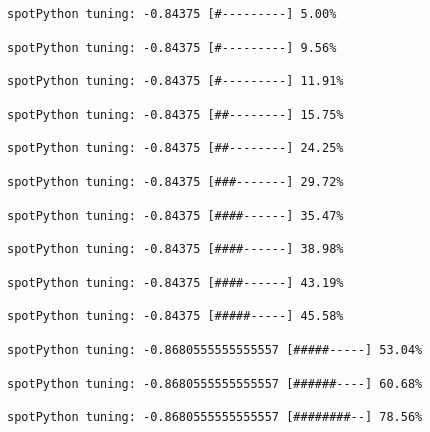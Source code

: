 \documentclass[
  letterpaper,
  DIV=11,
  numbers=noendperiod]{scrreprt}
\begin{document}
\begin{verbatim}
spotPython tuning: -0.84375 [#---------] 5.00% 
\end{verbatim}

\begin{verbatim}
spotPython tuning: -0.84375 [#---------] 9.56% 
\end{verbatim}

\begin{verbatim}
spotPython tuning: -0.84375 [#---------] 11.91% 
\end{verbatim}

\begin{verbatim}
spotPython tuning: -0.84375 [##--------] 15.75% 
\end{verbatim}

\begin{verbatim}
spotPython tuning: -0.84375 [##--------] 24.25% 
\end{verbatim}

\begin{verbatim}
spotPython tuning: -0.84375 [###-------] 29.72% 
\end{verbatim}

\begin{verbatim}
spotPython tuning: -0.84375 [####------] 35.47% 
\end{verbatim}

\begin{verbatim}
spotPython tuning: -0.84375 [####------] 38.98% 
\end{verbatim}

\begin{verbatim}
spotPython tuning: -0.84375 [####------] 43.19% 
\end{verbatim}

\begin{verbatim}
spotPython tuning: -0.84375 [#####-----] 45.58% 
\end{verbatim}

\begin{verbatim}
spotPython tuning: -0.8680555555555557 [#####-----] 53.04% 
\end{verbatim}

\begin{verbatim}
spotPython tuning: -0.8680555555555557 [######----] 60.68% 
\end{verbatim}

\begin{verbatim}
spotPython tuning: -0.8680555555555557 [########--] 78.56% 
\end{verbatim}
\end{document}
